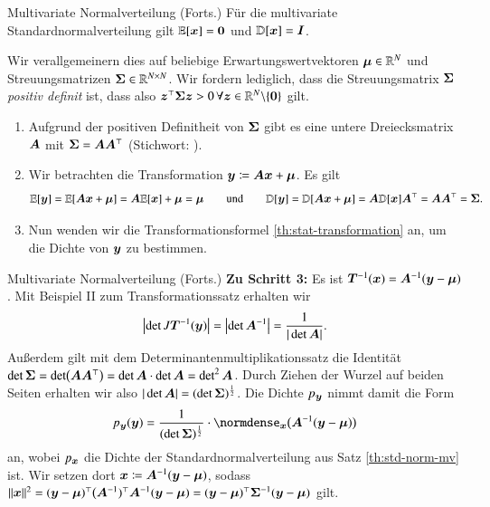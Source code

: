 \begin{frame}{Multivariate Normalverteilung (Forts.)}{}
	Für die multivariate Standardnormalverteilung gilt $\mathbb{E}[\bm{x}] = \bm{0}$ und $\mathbb{D}[\bm{x}] = \bm{I}$.

	Wir verallgemeinern dies auf beliebige Erwartungswertvektoren $\bm{\mu} \in \mathbb{R}^N$ und Streuungsmatrizen
	$\bm{\Sigma} \in \mathbb{R}^{N \times N}$.
	Wir fordern lediglich, dass die Streuungsmatrix $\bm{\Sigma}$ \textit{positiv definit} ist, dass also
	$\bm{z}^\top \bm{\Sigma} \bm{z} > 0\, \forall \bm{z} \in \mathbb{R}^N \backslash \{ \bm{0} \}$ gilt.

	\begin{enumerate}
		\item Aufgrund der positiven Definitheit von $\bm{\Sigma}$ gibt es eine untere Dreiecksmatrix $\bm{A}$ mit
			$\bm{\Sigma} = \bm{A} \bm{A}^\top$ (Stichwort: ).
		\item Wir betrachten die Transformation $\bm{y} \coloneqq \bm{A} \bm{x} + \bm{\mu}$. Es gilt
		\begin{equation*}
			\mathbb{E}[\bm{y}]
				= \mathbb{E}[\bm{A} \bm{x} + \bm{\mu}] = \bm{A} \mathbb{E}[\bm{x}] + \bm{\mu} = \bm{\mu} \qquad\text{und}
		\qquad
			\mathbb{D}[\bm{y}]
				= \mathbb{D}[\bm{A} \bm{x} + \bm{\mu}] = \bm{A} \mathbb{D}[\bm{x}] \bm{A}^\top = \bm{A} \bm{A}^\top = \bm{\Sigma}.
		\end{equation*}
		\item Nun wenden wir die Transformationsformel \ref{th:stat-transformation} an, um die Dichte von $\bm{y}$ zu bestimmen.
	\end{enumerate}
\end{frame}


\begin{frame}{Multivariate Normalverteilung (Forts.)}{}
	\textbf{Zu Schritt 3:} Es ist $\bm{T}^{-1}(\bm{x}) = \bm{A}^{-1} (\bm{y} - \bm{\mu})$. Mit Beispiel II zum Transformationssatz erhalten wir
	\begin{equation*}
		\bigl\vert \det J \bm{T}^{-1}(\bm{y}) \bigr\vert = \bigl\vert \det \bm{A}^{-1} \bigr\vert = \frac{1}{\vert \det \bm{A} \vert}.
	\end{equation*}
	Außerdem gilt mit dem Determinantenmultiplikationssatz die Identität
	$\det \bm{\Sigma} = \det\bigl( \bm{A} \bm{A}^\top \bigr) = \det \bm{A} \cdot \det \bm{A} = \det^2 \bm{A}$.
	Durch Ziehen der Wurzel auf beiden Seiten erhalten wir also $\vert \det \bm{A} \vert = (\det \bm{\Sigma})^{\frac{1}{2}}$. 
	Die Dichte $p_{\bm{y}}$ nimmt damit die Form
	\begin{equation*}
		p_{\by}(\by) = \frac{1}{(\det \bSigma)^\frac{1}{2}} \cdot \normdense_{\bx}\bigl( \bA^{-1} (\by - \bmu) \bigr)
	\end{equation*}
	an, wobei $p_{\bm{x}}$ die Dichte der Standardnormalverteilung aus Satz \ref{th:std-norm-mv} ist. Wir setzen dort
	$\bm{x} \coloneqq \bm{A}^{-1} (\bm{y} - \bm{\mu})$, sodass
	$\Vert \bm{x} \Vert^2 = (\bm{y} - \bm{\mu})^\top \bigl(\bm{A}^{-1})^\top \bm{A}^{-1} (\bm{y} - \bm{\mu}) = (\bm{y} - \bm{\mu})^\top \bm{\Sigma}^{-1} (\bm{y} - \bm{\mu})$
	gilt. 
\end{frame}


